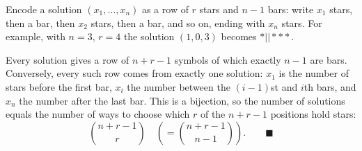 Encode a solution $(x_1,\dots,x_n)$ as a row of $r$ stars and $n-1$ bars: write $x_1$ stars, then a bar, then $x_2$ stars, then a bar, and so on, ending with $x_n$ stars. For example, with $n=3$, $r=4$ the solution $(1,0,3)$ becomes $*||***$.

Every solution gives a row of $n+r-1$ symbols of which exactly $n-1$ are bars. Conversely, every such row comes from exactly one solution: $x_1$ is the number of stars before the first bar, $x_i$ the number between the $(i-1)$st and $i$th bars, and $x_n$ the number after the last bar. This is a bijection, so the number of solutions equals the number of ways to choose which $r$ of the $n+r-1$ positions hold stars:
\[
\binom{n+r-1}{r}\quad\left(=\binom{n+r-1}{n-1}\right).\qquad\blacksquare
\]
